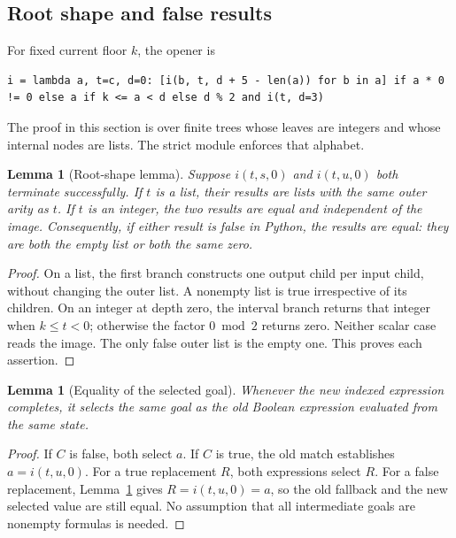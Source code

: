 \documentclass[11pt,letterpaper]{article}
\newtheorem{lemma}[theorem]{Lemma}
\theoremstyle{definition}
\begin{document}
\subsection{Root shape and false results}
For fixed current floor $k$, the opener is
\begin{lstlisting}
i = lambda a, t=c, d=0: [i(b, t, d + 5 - len(a)) for b in a] if a * 0 != 0 else a if k <= a < d else d % 2 and i(t, d=3)
\end{lstlisting}
The proof in this section is over finite trees whose leaves are integers
and whose internal nodes are lists. The strict module enforces that alphabet.

\begin{lemma}[Root-shape lemma]\label{lem:root}
Suppose $i(t,s,0)$ and $i(t,u,0)$ both terminate successfully. If $t$ is a
list, their results are lists with the same outer arity as $t$. If $t$ is
an integer, the two results are equal and independent of the image.
Consequently, if either result is false in Python, the results are equal:
they are both the empty list or both the same zero.
\end{lemma}
\begin{proof}
On a list, the first branch constructs one output child per input child,
without changing the outer list. A nonempty list is true irrespective of
its children. On an integer at depth zero, the interval branch returns
that integer when $k\le t<0$; otherwise the factor $0\bmod2$ returns zero.
Neither scalar case reads the image. The only false outer list is the
empty one. This proves each assertion.
\end{proof}

\begin{lemma}[Equality of the selected goal]\label{lem:selection}
Whenever the new indexed expression completes, it selects the same goal
as the old Boolean expression evaluated from the same state.
\end{lemma}
\begin{proof}
If $C$ is false, both select $a$. If $C$ is true, the old match establishes
$a=i(t,u,0)$. For a true replacement $R$, both expressions select $R$.
For a false replacement, Lemma~\ref{lem:root} gives $R=i(t,u,0)=a$, so the
old fallback and the new selected value are still equal. No assumption
that all intermediate goals are nonempty formulas is needed.
\end{proof}
\end{document}
